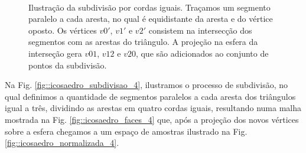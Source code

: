 \documentclass[
    12pt,                %
    oneside,            %
    a4paper,            %
    english,            %
    french,                %
    spanish,            %
    brazil                %
    ]{abntex2}
\begin{document}
\begin{figure}[htb]
    \centering
    
    \\
    \caption{ Ilustração da subdivisão por cordas iguais. Traçamos um segmento paralelo a cada aresta, no qual é equidistante da aresta e do vértice oposto. Os vértices $v0'$, $v1'$ e $v2'$ consistem na intersecção dos segmentos com as arestas do triângulo. A projeção na esfera da interseção gera $v01$, $v12$ e $v20$, que são adicionados ao conjunto de pontos da subdivisão.
    }
    \label{fig::triangle_subdivisao}
\end{figure}

Na Fig. \ref{fig::icosaedro_subdivisao_4}, ilustramos o processo de subdivisão, no qual definimos a quantidade de segmentos paralelos a cada aresta dos triângulos igual a três, dividindo as arestas em quatro cordas iguais, resultando numa malha mostrada na Fig. \ref{fig::icosaedro_faces_4} que, após a projeção dos novos vértices sobre a esfera chegamos a um espaço de amostras ilustrado na Fig. \ref{fig::icosaedro_normalizada_4}.
\end{document}
